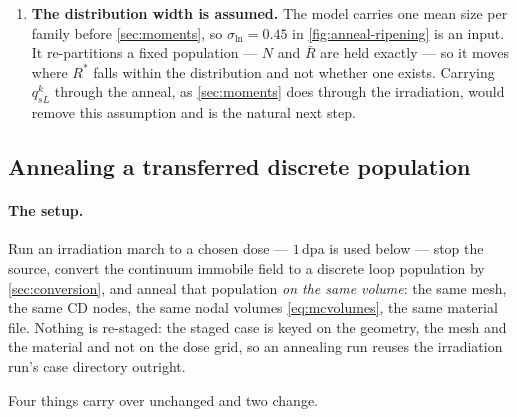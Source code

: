 \documentclass{article}
\begin{document}
\begin{enumerate}
      with the screening length \cref{eq:screening} and small compared with the
      gradients of $n^k_{sL}(\bm x)$. It is evaluated here on the interior mean,
      which is the same restriction \cref{sec:refusal} and the hardening study
      impose, and for the same reason.
\item \textbf{The distribution width is assumed.} The model carries one mean size
      per family before \cref{sec:moments}, so $\sigma_{\ln}=0.45$ in
      \cref{fig:anneal-ripening} is an input. It re-partitions a fixed population
      --- $N$ and $\bar R$ are held exactly --- so it moves where $R^\ast$ falls
      within the distribution and not whether one exists. Carrying $q^k_{sL}$
      through the anneal, as \cref{sec:moments} does through the irradiation,
      would remove this assumption and is the natural next step.
\end{enumerate}

\subsection{Annealing a transferred discrete population}
\label{sec:anneal-discrete}

\paragraph{The setup.} Run an irradiation march to a chosen dose --- $1\,$dpa is
used below --- stop the source, convert the continuum immobile field to a discrete
loop population by \cref{sec:conversion}, and anneal that population \emph{on the
same volume}: the same mesh, the same CD nodes, the same nodal volumes
\cref{eq:mcvolumes}, the same material file. Nothing is re-staged: the staged
case is keyed on the geometry, the mesh and the material and not on the
dose grid, so an annealing run reuses the irradiation run's case
directory outright.

Four things carry over unchanged and two change.
\end{document}
